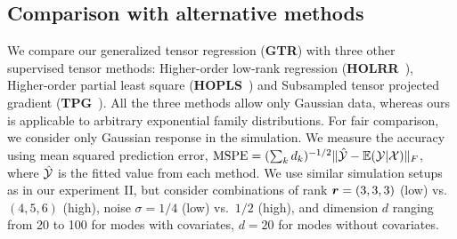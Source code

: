 \documentclass{article}
\theoremstyle{plain}
\theoremstyle{definition}
\begin{document}
\subsection{Comparison with alternative methods}
We compare our generalized tensor regression ({\bf GTR}) with three other supervised tensor methods: Higher-order low-rank regression ({\bf HOLRR}~\cite{rabusseau2016low}), Higher-order partial least square ({\bf HOPLS}~\cite{zhao2012higher})  and Subsampled tensor projected gradient ({\bf TPG}~\cite{yu2016learning}). All the three methods allow only Gaussian data, whereas ours is applicable to arbitrary exponential family distributions. For fair comparison, we consider only Gaussian response in the simulation. We measure the accuracy using mean squared prediction error, $\text{MSPE}=(\sum_kd_k)^{-1/2}\lVert\hat {\mathcal{Y}}-\mathbb{E}(\mathcal{Y}|\mathcal{X})\rVert_F$, where $\hat {\mathcal{Y}}$ is the fitted value from each method.  We use similar simulation setups as in our experiment II, but consider combinations of rank $\bm{r}=(3,3,3)$ (low) vs.\ $(4,5,6)$ (high), noise $\sigma = 1/4$ (low) vs.\ $1/2$ (high), and dimension $d$ ranging from 20 to 100 for modes with covariates, $d = 20$ for modes without covariates. 
\end{document}
